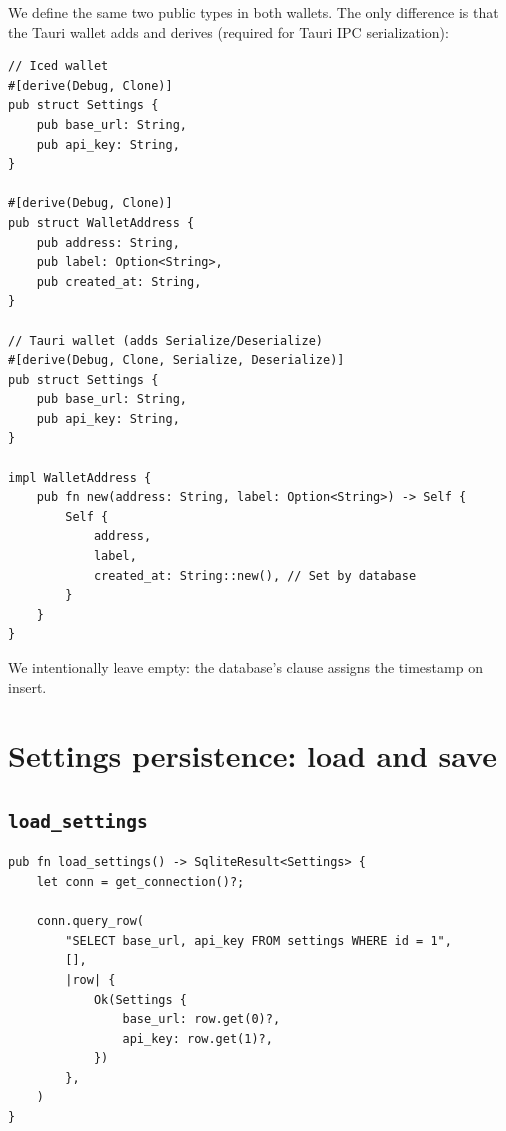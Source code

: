 We define the same two public types in both wallets. The only difference is that the Tauri wallet adds  and  derives (required for Tauri IPC serialization):

\begin{listing}[htbp]
\caption{Public data types ( and )}
\label{lst:ch20-types}
\begin{verbatim}
// Iced wallet
#[derive(Debug, Clone)]
pub struct Settings {
    pub base_url: String,
    pub api_key: String,
}

#[derive(Debug, Clone)]
pub struct WalletAddress {
    pub address: String,
    pub label: Option<String>,
    pub created_at: String,
}

// Tauri wallet (adds Serialize/Deserialize)
#[derive(Debug, Clone, Serialize, Deserialize)]
pub struct Settings {
    pub base_url: String,
    pub api_key: String,
}

impl WalletAddress {
    pub fn new(address: String, label: Option<String>) -> Self {
        Self {
            address,
            label,
            created_at: String::new(), // Set by database
        }
    }
}
\end{verbatim}
\end{listing}

We intentionally leave  empty: the database's  clause assigns the timestamp on insert.

\section{Settings persistence: load and save}
\label{sec:settings-crud}

\subsection{\texttt{load\_settings}}
\label{sec:load-settings}

\begin{listing}[H]
\caption{Reading settings from the singleton row}
\label{lst:ch20-load-settings}
\begin{verbatim}
pub fn load_settings() -> SqliteResult<Settings> {
    let conn = get_connection()?;

    conn.query_row(
        "SELECT base_url, api_key FROM settings WHERE id = 1",
        [],
        |row| {
            Ok(Settings {
                base_url: row.get(0)?,
                api_key: row.get(1)?,
            })
        },
    )
}
\end{verbatim}
\end{listing}

